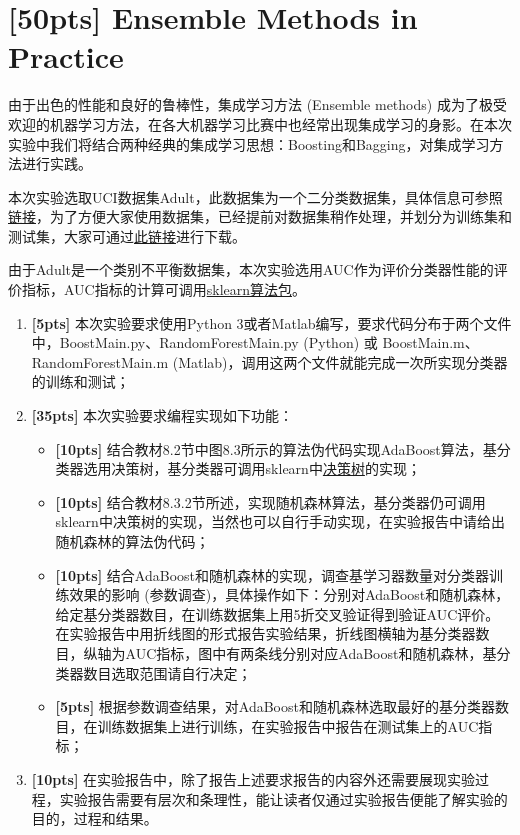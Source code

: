 \documentclass[a4paper,UTF8]{article}
\numberwithin{equation}{section}
\begin{document}
\section{[50pts] Ensemble Methods in Practice}

由于出色的性能和良好的鲁棒性，集成学习方法 (Ensemble methods) 成为了极受欢迎的机器学习方法，在各大机器学习比赛中也经常出现集成学习的身影。在本次实验中我们将结合两种经典的集成学习思想：Boosting和Bagging，对集成学习方法进行实践。

本次实验选取UCI数据集Adult，此数据集为一个二分类数据集，具体信息可参照\href{http://archive.ics.uci.edu/ml/datasets/Adult}{链接}，为了方便大家使用数据集，已经提前对数据集稍作处理，并划分为训练集和测试集，大家可通过\href{ftp://lamda.nju.edu.cn/ml2018/PS5/adult_dataset.zip}{此链接}进行下载。

由于Adult是一个类别不平衡数据集，本次实验选用AUC作为评价分类器性能的评价指标，AUC指标的计算可调用\href{http://scikit-learn.org/stable/modules/generated/sklearn.metrics.roc_auc_score.html}{sklearn算法包}。

\begin{enumerate}[(1)]
	\item \textbf{[5pts]} 本次实验要求使用Python 3或者Matlab编写，要求代码分布于两个文件中，BoostMain.py、RandomForestMain.py (Python) 或 BoostMain.m、RandomForestMain.m (Matlab)，调用这两个文件就能完成一次所实现分类器的训练和测试；
	
	\item \textbf{[35pts]} 本次实验要求编程实现如下功能：
	
	\begin{itemize}
		\item \textbf{[10pts]} 结合教材8.2节中图8.3所示的算法伪代码实现AdaBoost算法，基分类器选用决策树，基分类器可调用sklearn中\href{http://scikit-learn.org/stable/modules/generated/sklearn.tree.DecisionTreeClassifier.html}{决策树}的实现；
		\item \textbf{[10pts]} 结合教材8.3.2节所述，实现随机森林算法，基分类器仍可调用sklearn中决策树的实现，当然也可以自行手动实现，在实验报告中请给出随机森林的算法伪代码；
		\item \textbf{[10pts]} 结合AdaBoost和随机森林的实现，调查基学习器数量对分类器训练效果的影响 (参数调查)，具体操作如下：分别对AdaBoost和随机森林，给定基分类器数目，在训练数据集上用5折交叉验证得到验证AUC评价。在实验报告中用折线图的形式报告实验结果，折线图横轴为基分类器数目，纵轴为AUC指标，图中有两条线分别对应AdaBoost和随机森林，基分类器数目选取范围请自行决定；
		\item \textbf{[5pts]} 根据参数调查结果，对AdaBoost和随机森林选取最好的基分类器数目，在训练数据集上进行训练，在实验报告中报告在测试集上的AUC指标；
	\end{itemize}
	
	\item \textbf{[10pts]} 在实验报告中，除了报告上述要求报告的内容外还需要展现实验过程，实验报告需要有层次和条理性，能让读者仅通过实验报告便能了解实验的目的，过程和结果。
	
\end{enumerate}

	
\end{document}
